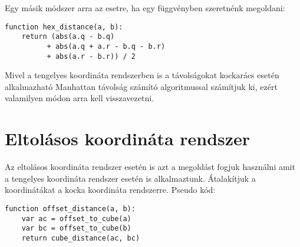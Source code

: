 \noindent Egy másik módszer arra az esetre, ha egy függvényben szeretnénk megoldani:
\begin{verbatim} 
function hex_distance(a, b):
    return (abs(a.q - b.q) 
          + abs(a.q + a.r - b.q - b.r)
          + abs(a.r - b.r)) / 2
\end{verbatim}          

\noindent Mivel a tengelyes koordináta rendszerben is a távolságokat kockarács esetén alkalmazható Manhattan távolság számító algoritmussal számítjuk ki, ezért valamilyen módon arra kell visszavezetni.

\section{Eltolásos koordináta rendszer}

Az eltolásos koordináta rendszer esetén is azt a megoldást fogjuk használni amit a tengelyes koordináta rendszer esetén is alkalmaztunk. Átalakítjuk a koordinátákat a kocka koordináta rendszerre.
\newline
\newline Pseudo kód:
\begin{verbatim} 
function offset_distance(a, b):
    var ac = offset_to_cube(a)
    var bc = offset_to_cube(b)
    return cube_distance(ac, bc)
\end{verbatim}  
